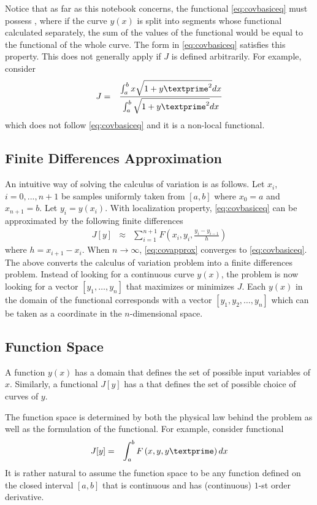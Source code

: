 Notice that as far as this notebook concerns, the functional \eqref{eq:covbasiceq} must possess , where if the curve $y(x)$ is split into segments whose functional calculated separately, the sum of the values of the functional would be equal to the functional of the whole curve. The form in \eqref{eq:covbasiceq} satisfies this property. This does not generally apply if $J$ is defined arbitrarily. For example, consider
\begin{eqnarray}
	J &=& \frac{\int_{a}^{b}x\sqrt{1+y\textprime^2}dx}{\int_{a}^{b}\sqrt{1+y\textprime^2}dx} \nonumber
\end{eqnarray}
which does not follow \eqref{eq:covbasiceq} and it is a non-local functional.

\subsection{Finite Differences Approximation}

An intuitive way of solving the calculus of variation is as follows. Let $x_i$, $i=0,...,n+1$ be samples uniformly taken from $[a,b]$ where $x_0 = a$ and $x_{n+1}=b$. Let $y_i = y(x_i)$. With localization property, \eqref{eq:covbasiceq} can be approximated by the following finite differences
\begin{eqnarray}
	J[y] &\approx&  \sum_{i=1}^{n+1} F\left(x_i, y_i, \frac{y_i-y_{i-1}}{h}\right) \label{eq:covapprox}
\end{eqnarray}
where $h=x_{i+1}-x_i$. When $n\rightarrow\infty$, \eqref{eq:covapprox} converges to \eqref{eq:covbasiceq}. The above converts the calculus of variation problem into a finite differences problem. Instead of looking for a continuous curve $y(x)$, the problem is now looking for a vector $[y_1, \ldots, y_n]$ that maximizes or minimizes $J$. Each $y(x)$ in the domain of the functional corresponds with a vector $[y_1, y_2, \ldots, y_n]$ which can be taken as a coordinate in the $n$-dimensional space.


\subsection{Function Space}

A function $y(x)$ has a domain that defines the set of possible input variables of $x$. Similarly, a functional $J[y]$ has a  that defines the set of possible choice of curves of $y$. 

The function space is determined by both the physical law behind the problem as well as the formulation of the functional. For example, consider functional
\begin{eqnarray}
	J[y] &=& \int_{a}^{b} F\left(x, y, y\textprime\right)dx \nonumber
\end{eqnarray}
It is rather natural to assume the function space to be any function defined on the closed interval $[a,b]$ that is continuous and has (continuous) $1$-st order derivative.

